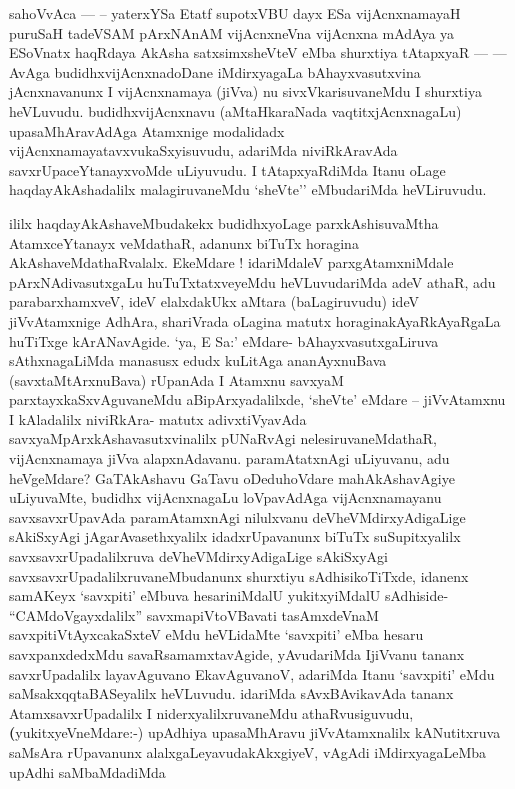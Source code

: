 \begin{artha}
sahoVvAca {\rm ---} -- yaterxYSa Etatf supotxV\s BU dayx ESa vijAcnxnamayaH
puruSaH tadeVSAM pArxNAnAM vijAcnxneVna vijAcnxna mAdAya ya ESoV\s natx
haqRdaya AkAsha satxsimxsheVteV eMba shurxtiya tAtapxyaR  {\rm ---}  {\rm ---} AvAga
budidhxvijAcnxnadoDane iMdirxyagaLa bAhayxvasutxvina jAcnxnavanunx I
vijAcnxnamaya (jiVva) nu sivxVkarisuvaneMdu I shurxtiya
heVLuvudu. budidhxvijAcnxnavu (aMtaHkaraNada vaqtitxjAcnxnagaLu)
upasaMhAravAdAga Atamxnige modalidadx
vijAcnxnamayatavxvukaSxyisuvudu, adariMda niviRkAravAda
savxrUpaceYtanayxvoMde uLiyuvudu. I tAtapxyaRdiMda Itanu oLage
haqdayAkAshadalilx malagiruvaneMdu `sheVte'' eMbudariMda heVLiruvudu.
\end{artha}

\begin{artha}
ililx haqdayAkAshaveMbudakekx budidhxyoLage parxkAshisuvaMtha
AtamxceYtanayx veMdathaR, adanunx biTuTx horagina
AkAshaveMdathaRvalalx. EkeMdare ! idariMdaleV parxgAtamxniMdale
pArxNAdivasutxgaLu huTuTxtatxveyeMdu heVLuvudariMda adeV athaR, adu
parabarxhamxveV, ideV elalxdakUkx aMtara (baLagiruvudu) ideV
jiVvAtamxnige AdhAra, shariVrada oLagina matutx horaginakAyaRkAyaRgaLa
huTiTxge kArANavAgide. `ya, E Sa:' eMdare- bAhayxvasutxgaLiruva
sAthxnagaLiMda manasusx edudx kuLitAga ananAyxnuBava
(savxtaMtArxnuBava) rUpanAda I Atamxnu savxyaM parxtayxkaSxvAguvaneMdu
aBipArxyadalilxde, `sheVte' eMdare -- jiVvAtamxnu I kAladalilx
niviRkAra- matutx adivxtiVyavAda savxyaMpArxkAshavasutxvinalilx
pUNaRvAgi nelesiruvaneMdathaR, vijAcnxnamaya jiVva
alapxnAdavanu. paramAtatxnAgi uLiyuvanu, adu heVgeMdare? GaTAkAshavu
GaTavu oDeduhoVdare mahAkAshavAgiye uLiyuvaMte, budidhx vijAcnxnagaLu
loVpavAdAga vijAcnxnamayanu savxsavxrUpavAda paramAtamxnAgi nilulxvanu
deVheVMdirxyAdigaLige sAkiSxyAgi jAgarAvasethxyalilx idadxrUpavanunx
biTuTx suSupitxyalilx savxsavxrUpadalilxruva deVheVMdirxyAdigaLige
sAkiSxyAgi savxsavxrUpadalilxruvaneMbudanunx shurxtiyu sAdhisikoTiTxde, idanenx
samAKeyx `savxpiti' eMbuva hesariniMdalU yukitxyiMdalU sAdhiside-
``CAMdoVgayxdalilx'' savxmapiVtoVBavati  tasAmxdeVnaM
savxpitiVtAyxcakaSxteV eMdu heVLidaMte `savxpiti' eMba hesaru
savxpanxdedxMdu savaRsamamxtavAgide, yAvudariMda IjiVvanu tananx
savxrUpadalilx layavAguvano EkavAguvanoV, adariMda Itanu `savxpiti'
eMdu saMsakxqqtaBASeyalilx heVLuvudu. idariMda sAvxBAvikavAda tananx
AtamxsavxrUpadalilx I niderxyalilxruvaneMdu
athaRvusiguvudu, \textbf(yukitxyeVneMdare:-) upAdhiya upasaMhAravu
jiVvAtamxnalilx kANutitxruva saMsAra rUpavanunx
alalxgaLeyavudakAkxgiyeV, vAgAdi iMdirxyagaLeMba upAdhi saMbaMdadiMda

\end{artha}
